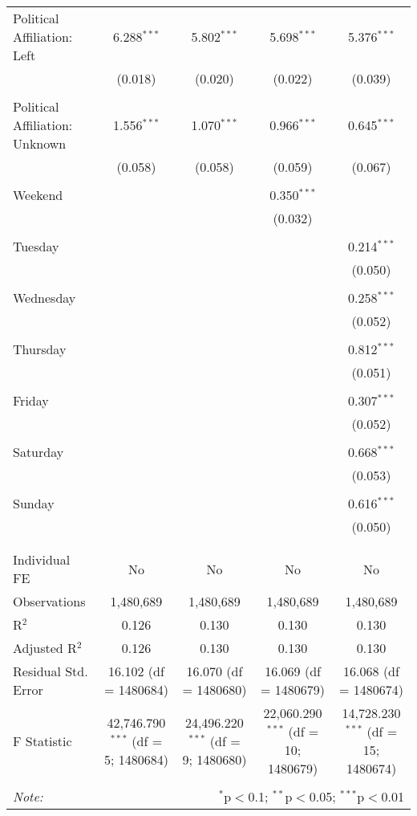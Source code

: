 \documentclass[
]{article}
\begin{document}
\begin{table}[!htbp]
{\begin{tabular}{@{\extracolsep{5pt}}lcccc}
 Political Affiliation: Left & 6.288$^{***}$ & 5.802$^{***}$ & 5.698$^{***}$ & 5.376$^{***}$ \\ 
  & (0.018) & (0.020) & (0.022) & (0.039) \\ 
  & & & & \\ 
 Political Affiliation: Unknown & 1.556$^{***}$ & 1.070$^{***}$ & 0.966$^{***}$ & 0.645$^{***}$ \\ 
  & (0.058) & (0.058) & (0.059) & (0.067) \\ 
  & & & & \\ 
 Weekend &  &  & 0.350$^{***}$ &  \\ 
  &  &  & (0.032) &  \\ 
  & & & & \\ 
 Tuesday &  &  &  & 0.214$^{***}$ \\ 
  &  &  &  & (0.050) \\ 
  & & & & \\ 
 Wednesday &  &  &  & 0.258$^{***}$ \\ 
  &  &  &  & (0.052) \\ 
  & & & & \\ 
 Thursday &  &  &  & 0.812$^{***}$ \\ 
  &  &  &  & (0.051) \\ 
  & & & & \\ 
 Friday &  &  &  & 0.307$^{***}$ \\ 
  &  &  &  & (0.052) \\ 
  & & & & \\ 
 Saturday &  &  &  & 0.668$^{***}$ \\ 
  &  &  &  & (0.053) \\ 
  & & & & \\ 
 Sunday &  &  &  & 0.616$^{***}$ \\ 
  &  &  &  & (0.050) \\ 
  & & & & \\ 
\hline \\[-1.8ex] 
Individual FE & No & No & No & No \\ 
Observations & 1,480,689 & 1,480,689 & 1,480,689 & 1,480,689 \\ 
R$^{2}$ & 0.126 & 0.130 & 0.130 & 0.130 \\ 
Adjusted R$^{2}$ & 0.126 & 0.130 & 0.130 & 0.130 \\ 
Residual Std. Error & 16.102 (df = 1480684) & 16.070 (df = 1480680) & 16.069 (df = 1480679) & 16.068 (df = 1480674) \\ 
F Statistic & 42,746.790$^{***}$ (df = 5; 1480684) & 24,496.220$^{***}$ (df = 9; 1480680) & 22,060.290$^{***}$ (df = 10; 1480679) & 14,728.230$^{***}$ (df = 15; 1480674) \\ 
\hline 
\hline \\[-1.8ex] 
\textit{Note:}  & \multicolumn{4}{r}{$^{*}$p$<$0.1; $^{**}$p$<$0.05; $^{***}$p$<$0.01} \\ 
\end{tabular}
} 
\end{table} 
\newpage
\end{document}
